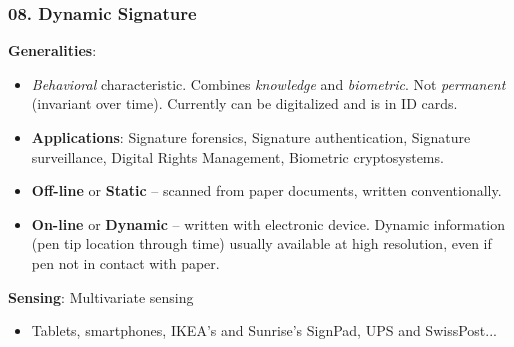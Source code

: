 \documentclass[a4paper]{article}
\begin{document}
    \subsubsection*{08. Dynamic Signature}
      \textbf{Generalities}:
      \begin{itemize}
        \item \emph{Behavioral} characteristic. Combines \emph{knowledge} and \emph{biometric}. Not \emph{permanent} (invariant over time). Currently can be digitalized and is in ID cards.
        \item \textbf{Applications}: Signature forensics, Signature authentication, Signature surveillance, Digital Rights Management, Biometric cryptosystems.
        \item \textbf{Off-line} or \textbf{Static} -- scanned from paper documents, written conventionally.
        \item \textbf{On-line} or \textbf{Dynamic} -- written with electronic device. Dynamic information (pen tip location through time) usually available at high resolution, even if pen not in contact with paper.
      \end{itemize}

      \textbf{Sensing}: Multivariate sensing
      \begin{itemize}
        \item Tablets, smartphones, IKEA's and Sunrise's SignPad, UPS and SwissPost...
      \end{itemize}
\end{document}
